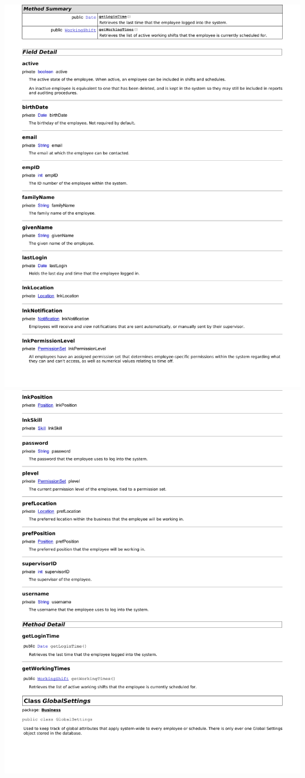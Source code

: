 \documentclass[letterpaper,12pt]{report}
\begin{document}
\includegraphics[scale=0.9,trim=20mm 30mm 25mm 8mm]{externals/db2.pdf}
\newpage
\includegraphics[scale=0.9,trim=20mm 30mm 25mm 0mm]{externals/db3.pdf}
\end{document}
